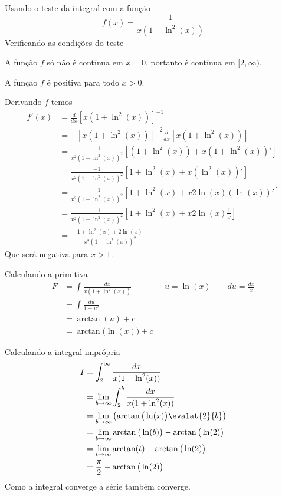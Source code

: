 \documentclass[a4paper,12pt,fleqn]{article}
\begin{document}
\begin{answer}
Usando o teste da integral com a função
\[
  f(x) = \frac{1}{x\left(1+\ln^2(x)\right)}
\]
Verificando as condições do teste

A função $f$ só não é contínua em $x=0$, portanto é contínua em $[2, \infty)$.

A funçao $f$ é positiva para todo $x>0$.

Derivando $f$ temos
\begin{align*}
  f'(x)
  & = \frac{d}{dx}\left[x\left(1+\ln^2(x)\right)\right]^{-1} \\
  & = -\left[x\left(1+\ln^2(x)\right)\right]^{-2}
       \frac{d}{dx}\left[x\left(1+\ln^2(x)\right)\right] \\
  & = \frac{-1}{x^2\left(1+\ln^2(x)\right)^2}
      \left[\left(1+\ln^2(x)\right) + x\left(1+\ln^2(x)\right)'\right] \\
  & = \frac{-1}{x^2\left(1+\ln^2(x)\right)^2}
      \left[1+\ln^2(x) + x\left(\ln^2(x)\right)'\right] \\
  & = \frac{-1}{x^2\left(1+\ln^2(x)\right)^2}
      \left[1+\ln^2(x) + x2\ln(x)\left(\ln(x)\right)'\right] \\
  & = \frac{-1}{x^2\left(1+\ln^2(x)\right)^2}
      \left[1+\ln^2(x) + x2\ln(x)\frac{1}{x}\right] \\
  & = -\frac{1+\ln^2(x) + 2\ln(x)}{x^2\left(1+\ln^2(x)\right)^2}
\end{align*}
Que será negativa para $x>1$.

Calculando a primitiva
\begin{align*}
  F & = \int \frac{dx}{x(1+\ln^2(x))}
    \qquad\qquad  u = \ln(x) \qquad du = \frac{dx}{x} \\
    & = \int \frac{du}{1+u^2} \\
    & = \arctan(u) + c \\
    & = \arctan\big(\ln(x)\big) + c
\end{align*}

Calculando a integral imprópria
\begin{align*}
  I
  & = \int_2^\infty \frac{dx}{x(1+\ln^2(x))} \\
  & = \lim_{b\to\infty} \int_2^b \frac{dx}{x(1+\ln^2(x))} \\
  & = \lim_{b\to\infty} \left(\arctan\big(\ln(x)\big)\evalat{2}{b}\right)  \\
  & = \lim_{b\to\infty} \arctan\big(\ln(b)\big) - \arctan\big(\ln(2)\big)  \\
  & = \lim_{t\to\infty} \arctan(t) - \arctan\big(\ln(2)\big)  \\
  & = \frac{\pi}{2} - \arctan\big(\ln(2)\big)  \\
\end{align*}
Como a integral converge a série também converge.
\end{answer}
\end{document}
